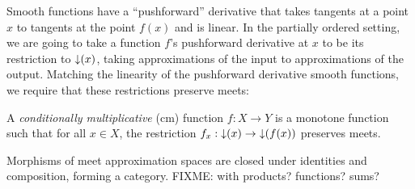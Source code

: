 Smooth functions have a ``pushforward'' derivative that takes tangents at a point $x$ to tangents at the point $f(x)$ and is linear. In the partially ordered setting, we are going to take a function $f$'s pushforward derivative at $x$ to be its restriction to $\mathop{\downarrow}(x)$, taking approximations of the input to approximations of the output. Matching the linearity of the pushforward derivative smooth functions, we require that these restrictions preserve meets:

\begin{definition}
  A \emph{conditionally multiplicative} (cm) function $f : X \to Y$ is
  a monotone function such that for all $x \in X$, the restriction
  $f_x : \mathop{\downarrow}(x) \to \mathop{\downarrow}(f(x))$ preserves meets.
\end{definition}

\begin{lemma}
  Morphisms of meet approximation spaces are closed under identities
  and composition, forming a category. FIXME: with products?
  functions? sums?
\end{lemma}

